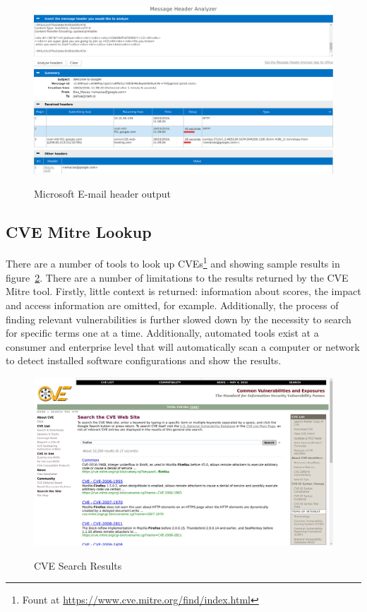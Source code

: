 \begin{figure}
\centering 
\includegraphics[width=0.8\linewidth]{microsoft-header} 
\label{fig:mic}
\caption{Microsoft E-mail header output}
\end{figure}

\subsection{CVE Mitre Lookup}
There are a number of tools to look up CVEs\footnote{Fount at \url{https://www.cve.mitre.org/find/index.html}} and showing sample results in figure~\ref{fig:cve}.  There are a number of limitations to the results returned by the CVE Mitre tool.  Firstly, little context is returned: information about scores, the impact and access information are omitted, for example.  Additionally, the process of finding relevant vulnerabilities is further slowed down by the necessity to search for specific terms one at a time.  Additionally, automated tools exist at a consumer and enterprise level that will automatically scan a computer or network to detect installed software configurations and show the results.  

\begin{figure}
\centering 
\includegraphics[width=0.8\linewidth]{cve-lookup} 
\label{fig:cve}
\caption{CVE Search Results}
\end{figure}

